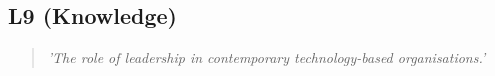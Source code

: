 \subsection{L9 (Knowledge)}

  \begin{quote}
    \textit{'The role of leadership in contemporary
    technology-based organisations.'}
  \end{quote}

\newpage